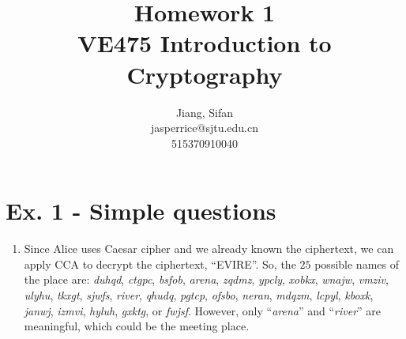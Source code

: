 \documentclass[11pt,a4paper]{article}
\title{
	Homework 1\\
	VE475 Introduction to Cryptography
}
\author{
	Jiang, Sifan\\
	jasperrice@sjtu.edu.cn\\
	515370910040
}
\begin{document}
\maketitle

\section*{Ex. 1 - Simple questions}
\begin{enumerate}
	\item Since Alice uses Caesar cipher and we already known the ciphertext, we can apply CCA to decrypt the ciphertext, ``EVIRE''. So, the $25$ possible names of the place are: \textit{duhqd}, \textit{ctgpc}, \textit{bsfob}, \textit{arena}, \textit{zqdmz}, \textit{ypcly}, \textit{xobkx}, \textit{wnajw}, \textit{vmziv}, \textit{ulyhu}, \textit{tkxgt}, \textit{sjwfs}, \textit{river}, \textit{qhudq}, \textit{pgtcp}, \textit{ofsbo}, \textit{neran}, \textit{mdqzm}, \textit{lcpyl}, \textit{kboxk}, \textit{janwj}, \textit{izmvi}, \textit{hyluh}, \textit{gxktg}, or \textit{fwjsf}. However, only ``\textit{arena}'' and ``\textit{river}'' are meaningful, which could be the meeting place.
	

\end{enumerate}
\end{document}
